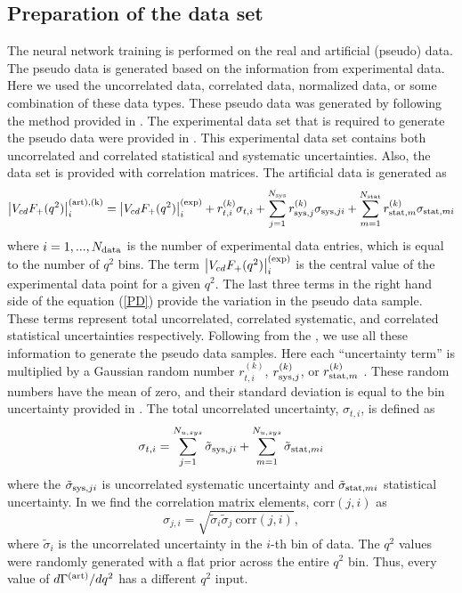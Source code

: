 \subsection{Preparation of the data set}
The neural network training is performed on the real and artificial (pseudo) data. The pseudo data is generated based on the information from experimental data. Here we used the uncorrelated data, correlated data, normalized data, or some combination of these data types. These pseudo data was generated by following the method provided in \cite{Rojo:2006nn}. The experimental data set that is required to generate the pseudo data were provided in \cite{Ablikim:2015ixa}.
This experimental data set contains both uncorrelated and correlated statistical and systematic uncertainties. Also, the data set is provided with correlation matrices. The artificial data is generated as \cite{Grant:2019yar}
%
\begin{equation} \label{PD}
\left|V_{cd} F_{+}(q^2)\right|^{\rm{(art)},(k)}_i = \left|V_{cd} F_{+}(q^2)\right|^{\rm (exp)}_i + r_{t,i}^{(k)}\sigma_{t,i} + \sum_{j=1}^{N_{\rm sys}}r_{{\rm sys},j}^{(k)}\sigma_{{\rm sys},ji} 
+ \sum_{m=1}^{N_{\rm stat}}r_{{\rm stat},m}^{(k)}\sigma_{{\rm stat},mi}
\end{equation}
%
where $i=1,...,N_{\rm data}$ is the number of experimental data entries, which is equal to the number of $q^2$ bins. The term $\left|V_{cd} F_{+}(q^2)\right|^{\rm (exp)}_i$ is the central value of the experimental data point for a given $q^2$. The last three terms in the right hand side of the equation (\ref{PD}) provide the variation in the pseudo data sample. These terms represent total uncorrelated, correlated systematic, and correlated statistical uncertainties respectively. Following from the \cite{Rojo:2006nn}, we use all these information to generate the pseudo data samples. Here each ``uncertainty term'' is multiplied by a Gaussian random number $r_{t,i}^{(k)}$, $r_{{\rm sys},j}^{(k)}$, or $r_{{\rm stat},m}^{(k)}$  \cite{Grant:2019yar}. These random numbers have the mean of zero, and their standard deviation is equal to the bin uncertainty provided in \cite{Ablikim:2015ixa}. The total uncorrelated uncertainty, $\sigma_{t,i}$, is defined as 
%
\begin{equation}
\sigma_{t,i} = \sum_{j=1}^{N_{u,sys}}\tilde{\sigma}_{{\rm sys},ji} + \sum_{m=1}^{N_{u,sys}}\tilde{\sigma}_{{\rm stat},mi}
\end{equation}
%
where the $\tilde{\sigma}_{{\rm sys},ji}$ is uncorrelated systematic uncertainty and $\tilde{\sigma}_{{\rm stat},mi}$ statistical uncertainty. In \cite{Ablikim:2015ixa} we find the correlation matrix elements, $\mbox{corr}(j,i)$ as 
%
\begin{equation}
\sigma_{j,i} = \sqrt{\tilde{\sigma}_i \tilde{\sigma}_j \ \mbox{corr}(j,i)},
\end{equation}
%
where $\tilde{\sigma}_i$ is the uncorrelated uncertainty in the $i$-th bin of data. The $q^2$ values were randomly generated with a flat prior across the entire $q^2$ bin. Thus, every value of $d\Gamma^{\rm (art)}/dq^2$ has a different $q^2$ input. 

